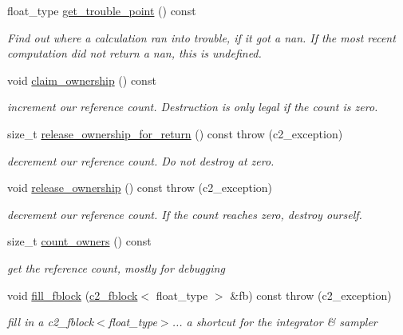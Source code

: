 \begin{DoxyCompactItemize}
float\-\_\-type \hyperlink{classc2__function_a8e575976851a0b93a9dc2803b4ac2123}{get\-\_\-trouble\-\_\-point} () const 
\begin{DoxyCompactList}\small\item\em Find out where a calculation ran into trouble, if it got a nan. If the most recent computation did not return a nan, this is undefined. \end{DoxyCompactList}\item 
\hypertarget{classc2__function_acd32e22d0b47878dc9fb399a722db61e}{void \hyperlink{classc2__function_acd32e22d0b47878dc9fb399a722db61e}{claim\-\_\-ownership} () const }\label{classc2__function_acd32e22d0b47878dc9fb399a722db61e}

\begin{DoxyCompactList}\small\item\em increment our reference count. Destruction is only legal if the count is zero. \end{DoxyCompactList}\item 
size\-\_\-t \hyperlink{classc2__function_af003b3e29357ccf65b7eba38be877b8c}{release\-\_\-ownership\-\_\-for\-\_\-return} () const   throw (c2\-\_\-exception)
\begin{DoxyCompactList}\small\item\em decrement our reference count. Do not destroy at zero. \end{DoxyCompactList}\item 
\hypertarget{classc2__function_ac98aa40f78c487df141a67174662d749}{void \hyperlink{classc2__function_ac98aa40f78c487df141a67174662d749}{release\-\_\-ownership} () const   throw (c2\-\_\-exception)}\label{classc2__function_ac98aa40f78c487df141a67174662d749}

\begin{DoxyCompactList}\small\item\em decrement our reference count. If the count reaches zero, destroy ourself. \end{DoxyCompactList}\item 
size\-\_\-t \hyperlink{classc2__function_a1df932c78b3521d6a4493972f2642020}{count\-\_\-owners} () const 
\begin{DoxyCompactList}\small\item\em get the reference count, mostly for debugging \end{DoxyCompactList}\item 
void \hyperlink{classc2__function_abdce52d0b89ff5bde13d9390ff8c2ba4}{fill\-\_\-fblock} (\hyperlink{classc2__fblock}{c2\-\_\-fblock}$<$ float\-\_\-type $>$ \&fb) const   throw (c2\-\_\-exception)
\begin{DoxyCompactList}\small\item\em fill in a c2\-\_\-fblock$<$float\-\_\-type$>$... a shortcut for the integrator \& sampler \end{DoxyCompactList}\end{DoxyCompactItemize}
